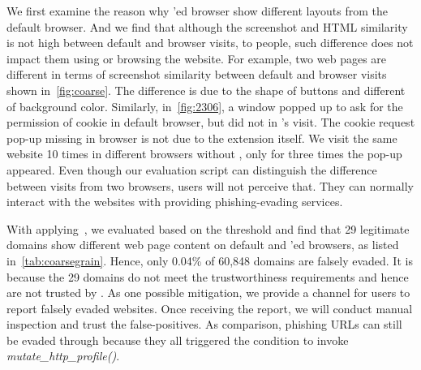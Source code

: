 We first examine the reason why \spartacus'ed browser show different layouts from the default browser.
And we find that although the screenshot and HTML similarity is not high between default and \spartacus browser visits,
to people, such difference does not impact them using or browsing the website.
For example, two web pages are different in terms of screenshot similarity between default and \spartacus browser visits shown in~\autoref{fig:coarse}.
The difference is due to the shape of buttons and different of background color.
Similarly, in~\autoref{fig:2306}, a window popped up to ask for the permission of cookie in default browser, but did not in \spartacus's visit.
The cookie request pop-up missing in \spartacus browser is not due to the extension itself.
We visit the same website 10 times in different browsers without \spartacus, only for three times the pop-up appeared.
Even though our evaluation script can distinguish the difference between visits from two browsers,
users will not perceive that.
They can normally interact with the websites with \spartacus providing phishing-evading services.




With applying~, we evaluated \spartacus based on the threshold and find that 29 legitimate domains show different web page content on default and \spartacus'ed browsers, as listed in~\autoref{tab:coarsegrain}.
Hence, only 0.04\% of 60,848 domains are falsely evaded.
It is because the 29 domains do not meet the trustworthiness requirements and hence are not trusted by \spartacus.
As one possible mitigation, we provide a channel for users to report falsely evaded websites.
Once receiving the report, we will conduct manual inspection and trust the false-positives.
As comparison, phishing URLs can still be evaded through \spartacus because they all triggered the condition to invoke \emph{mutate\_http\_profile()}.

